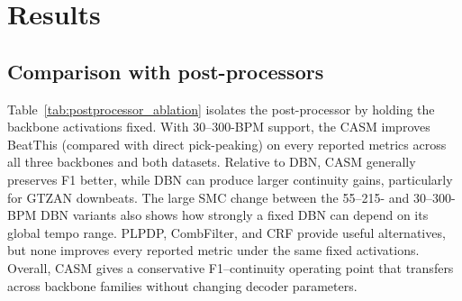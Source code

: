 \documentclass{article}
\begin{document}
\section{Results}
\label{sec:results}

\subsection{Comparison with post-processors}
Table~\ref{tab:postprocessor_ablation} isolates the post-processor by holding the backbone activations fixed. With 30--300-BPM support, the CASM improves BeatThis (compared with direct pick-peaking) on every reported metrics across all three backbones and both datasets. Relative to DBN, CASM generally preserves F1 better, while DBN can produce larger continuity gains, particularly for GTZAN downbeats. The large SMC change between the 55--215- and 30--300-BPM DBN variants also shows how strongly a fixed DBN can depend on its global tempo range. PLPDP, CombFilter, and CRF provide useful alternatives, but none improves every reported metric under the same fixed activations. Overall, CASM gives a conservative F1--continuity operating point that transfers across backbone families without changing decoder parameters.
\end{document}
